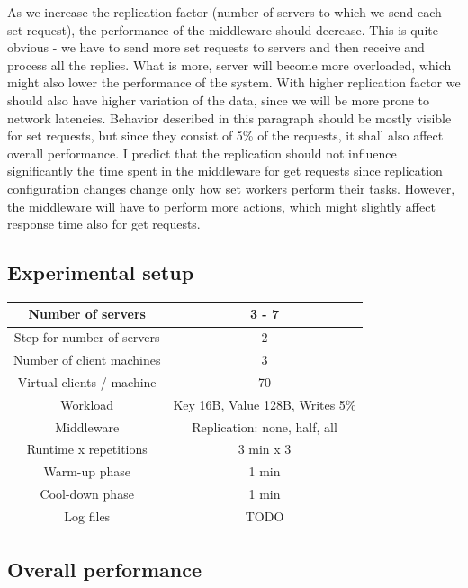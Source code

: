 \documentclass[11pt]{article}
\begin{document}
As we increase the replication factor (number of servers to which we send each set request), the performance of the middleware should decrease. This is quite obvious - we have to send more set requests to servers and then receive and process all the replies. What is more, server will become more overloaded, which might also lower the performance of the system. With higher replication factor we should also have higher variation of the data, since we will be more prone to network latencies. Behavior described in this paragraph should be mostly visible for set requests, but since they consist of 5\% of the requests, it shall also affect overall performance. I predict that the replication should not influence significantly the time spent in the middleware for get requests since replication configuration changes change only how set workers perform their tasks. However, the middleware will have to perform more actions, which might slightly affect response time also for get requests. 


\subsection{Experimental setup}

\small{
\smallskip
\begin{tabular}{|c|c|}
\hline Number of servers & 3 - 7 \\ 
\hline Step for number of servers & 2 \\
\hline Number of client machines & 3 \\ 
\hline Virtual clients / machine &  70 \\ 
\hline Workload & Key 16B, Value 128B, Writes 5\% \\
\hline Middleware & Replication: none, half, all \\ 
\hline Runtime x repetitions & 3 min x 3 \\
\hline Warm-up phase & 1 min \\
\hline Cool-down phase & 1 min \\
\hline Log files & TODO \\
\hline 
\end{tabular} }
\medskip

\subsection{Overall performance}
\label{sec:replication-overall}
\end{document}
